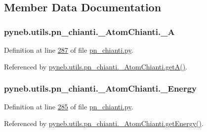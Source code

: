 \subsection{Member Data Documentation}
\hypertarget{classpyneb_1_1utils_1_1pn__chianti_1_1___atom_chianti_a4d531860236fc5a6564cc861b28cabe7}{
\subsubsection[{\-\_\-\-A}]{\setlength{\rightskip}{0pt plus 5cm}pyneb.\-utils.\-pn\-\_\-chianti.\-\_\-\-Atom\-Chianti.\-\_\-\-A\hspace{0.3cm}{\ttfamily [private]}}}\label{classpyneb_1_1utils_1_1pn__chianti_1_1___atom_chianti_a4d531860236fc5a6564cc861b28cabe7}


Definition at line \hyperlink{pn__chianti_8py_source_l00287}{287} of file \hyperlink{pn__chianti_8py_source}{pn\-\_\-chianti.\-py}.



Referenced by \hyperlink{pn__chianti_8py_source_l00316}{pyneb.\-utils.\-pn\-\_\-chianti.\-\_\-\-Atom\-Chianti.\-get\-A()}.

\hypertarget{classpyneb_1_1utils_1_1pn__chianti_1_1___atom_chianti_a7c9c9c75a6bacb0f6533e870cf556035}{
\subsubsection[{\-\_\-\-Energy}]{\setlength{\rightskip}{0pt plus 5cm}pyneb.\-utils.\-pn\-\_\-chianti.\-\_\-\-Atom\-Chianti.\-\_\-\-Energy\hspace{0.3cm}{\ttfamily [private]}}}\label{classpyneb_1_1utils_1_1pn__chianti_1_1___atom_chianti_a7c9c9c75a6bacb0f6533e870cf556035}


Definition at line \hyperlink{pn__chianti_8py_source_l00285}{285} of file \hyperlink{pn__chianti_8py_source}{pn\-\_\-chianti.\-py}.



Referenced by \hyperlink{pn__chianti_8py_source_l00366}{pyneb.\-utils.\-pn\-\_\-chianti.\-\_\-\-Atom\-Chianti.\-get\-Energy()}.


